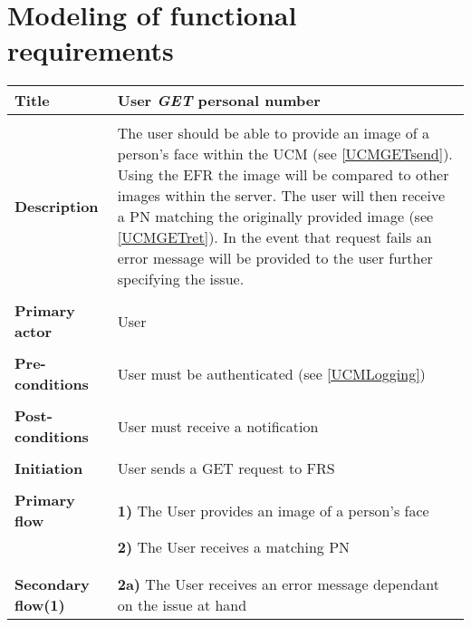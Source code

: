 \documentclass[a4paper,11pt]{article}
\begin{document}
\newpage
\section{Modeling of functional requirements}


\begin{tabular}{|p{3.5cm}|p{11.5cm}|} \hline
    \textbf{Title} &   User \emph{GET} personal number 
        
    \\ \hline \rowcolor{Gray} & \\ \hline
        
    \textbf{Description} &  The user should be able to provide an image of a person's face within the UCM (see \ref{UCMGETsend}). Using the EFR the image will be compared to other images within the server. The user will then receive a PN matching the originally provided image (see \ref{UCMGETret}). In the event that request fails an error message will be provided to the user further specifying the issue.
        
    \\ \hline \rowcolor{Gray} & \\ \hline
        
    \textbf{Primary actor} & User  
        
    \\ \hline \rowcolor{Gray} & \\ \hline 
          
    \textbf{Pre-conditions} &   User must be authenticated (see \ref{UCMLogging})
        
    \\ \hline \rowcolor{Gray} & \\ \hline
         
    \textbf{Post-conditions} &   User must receive a notification
        
    \\ \hline \rowcolor{Gray} & \\ \hline 
         
    \textbf{Initiation} & User sends a GET request to FRS
        
    \\ \hline \rowcolor{Gray} & \\ \hline 
         
    \textbf{Primary flow} & 
    \textbf{1)} The User provides an image of a person's face \\&
    \textbf{2)} The User receives a matching PN \\&
        
    \\ \hline \rowcolor{Gray} & \\ \hline 
         
    \textbf{Secondary flow(1)} & 
    \textbf{2a)} The User receives an error message dependant on the issue at hand
    \\ \hline 
\end{tabular}
\end{document}
